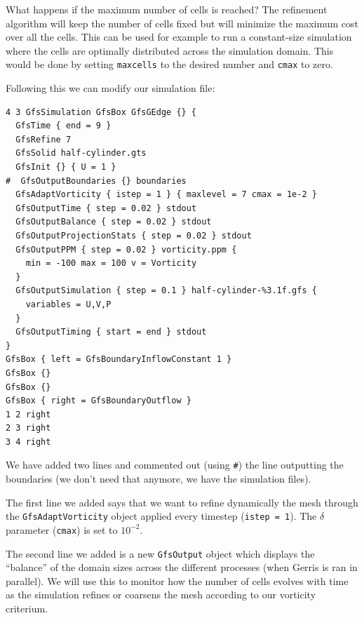 \documentclass[a4paper]{article}
\begin{document}
What happens if the maximum number of cells is reached? The refinement algorithm will keep the number of cells fixed but will minimize the maximum cost over all the cells. This can be used for example to run a constant-size simulation where the cells are optimally distributed across the simulation domain. This would be done by setting {\tt maxcells} to the desired number and {\tt cmax} to zero.

Following this we can modify our simulation file:
\begin{verbatim}
4 3 GfsSimulation GfsBox GfsGEdge {} {
  GfsTime { end = 9 }
  GfsRefine 7
  GfsSolid half-cylinder.gts
  GfsInit {} { U = 1 }
#  GfsOutputBoundaries {} boundaries
  GfsAdaptVorticity { istep = 1 } { maxlevel = 7 cmax = 1e-2 }
  GfsOutputTime { step = 0.02 } stdout
  GfsOutputBalance { step = 0.02 } stdout
  GfsOutputProjectionStats { step = 0.02 } stdout
  GfsOutputPPM { step = 0.02 } vorticity.ppm {
    min = -100 max = 100 v = Vorticity
  }
  GfsOutputSimulation { step = 0.1 } half-cylinder-%3.1f.gfs {
    variables = U,V,P
  }
  GfsOutputTiming { start = end } stdout
}
GfsBox { left = GfsBoundaryInflowConstant 1 }
GfsBox {}
GfsBox {}
GfsBox { right = GfsBoundaryOutflow }
1 2 right
2 3 right
3 4 right
\end{verbatim}
We have added two lines and commented out (using {\tt \#}) the line
outputting the boundaries (we don't need that anymore, we have the
simulation files).

The first line we added says that we want to refine dynamically the
mesh through the {\tt GfsAdaptVorticity} object applied every timestep
({\tt istep = 1}). The $\delta$ parameter ({\tt cmax}) is set to $10^{-2}$.

The second line we added is a new {\tt GfsOutput} object which displays 
the ``balance'' of the domain sizes across the different processes
(when Gerris is ran in parallel). We will use this to monitor how the
number of cells evolves with time as the simulation refines or
coarsens the mesh according to our vorticity criterium.
\end{document}

